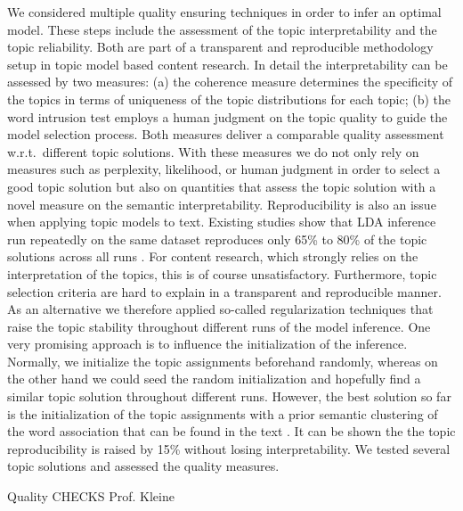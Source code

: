 \documentclass[a4paper,10pt]{article}
\newcommand{\TODO}[1]{\begingroup\color{red}#1\endgroup}
\begin{document}
We considered multiple quality ensuring techniques in order to infer an
optimal model. These steps include the assessment of the topic
interpretability and the topic reliability. Both are part of a transparent
and reproducible methodology setup in topic model based content research.
In detail the interpretability can be assessed by two measures: (a) the
coherence measure \cite{newman:2010} determines the specificity of the
topics in terms of uniqueness of the topic distributions for each topic;
(b) the word intrusion test \cite{chang:2009} employs a human judgment on
the topic quality to guide the model selection process. Both measures
deliver a comparable quality assessment w.r.t.\ different topic
solutions. With these measures we do not only rely on measures such as
perplexity, likelihood, or human judgment in order to select a good topic
solution but also on quantities that assess the topic solution with a novel
measure on the semantic interpretability. Reproducibility is also an issue
when applying topic models to text. Existing studies show that LDA
inference run repeatedly on the same dataset reproduces only 65\% to 80\%
of the topic solutions across all runs \cite{niekler:2012,koltcov:2016}.
For content research, which strongly relies on the interpretation of the
topics, this is of course unsatisfactory. Furthermore, topic selection
criteria are hard to explain in a transparent and reproducible manner. As
an alternative we therefore applied so-called regularization techniques
that raise the topic stability throughout different runs of the model
inference. One very promising approach is to influence the initialization
of the inference. Normally, we initialize the topic assignments beforehand
randomly, whereas on the other hand we could seed the random initialization
and hopefully find a similar topic solution throughout different
runs. However, the best solution so far is the initialization of the topic
assignments with a prior semantic clustering of the word association that
can be found in the text \cite{lancichinetti:2015}. It can be shown the the
topic reproducibility is raised by 15\% without losing interpretability. We
tested several topic solutions and assessed the quality measures.


\TODO{Quality CHECKS Prof. Kleine} 
\end{document}
